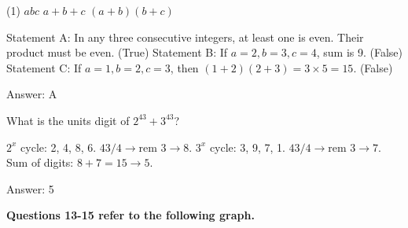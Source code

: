 \documentclass[11pt,paper=a4,answers]{exam}
\begin{document}
\begin{questions}
\begin{tasks}(1)
\task[A)] $abc$
\task[B)] $a + b + c$
\task[C)] $(a+b)(b+c)$
\end{tasks}

\begin{solution}
\begin{center}
Statement A: In any three consecutive integers, at least one is even. Their product must be even. (True)
\vspace{5pt}
Statement B: If $a=2, b=3, c=4$, sum is 9. (False)
\vspace{5pt}
Statement C: If $a=1, b=2, c=3$, then $(1+2)(2+3) = 3 \times 5 = 15$. (False)
\end{center}

Answer: \colorbox{yellow!100}{A}
\end{solution}

\vspace{1cm}


\question
What is the units digit of $2^{43} + 3^{43}$?

\begin{solution}
\begin{center}
$2^x$ cycle: 2, 4, 8, 6. $43 / 4 \to \text{rem } 3 \to 8$.
\vspace{5pt}
$3^x$ cycle: 3, 9, 7, 1. $43 / 4 \to \text{rem } 3 \to 7$.
\vspace{5pt}
Sum of digits: $8 + 7 = 15 \to 5$.
\end{center}

Answer: \colorbox{yellow!100}{5}
\end{solution}

\vspace{1cm}

\textbf{Questions 13-15 refer to the following graph.}

\begin{center}
\end{center}


\end{questions}
\end{document}
